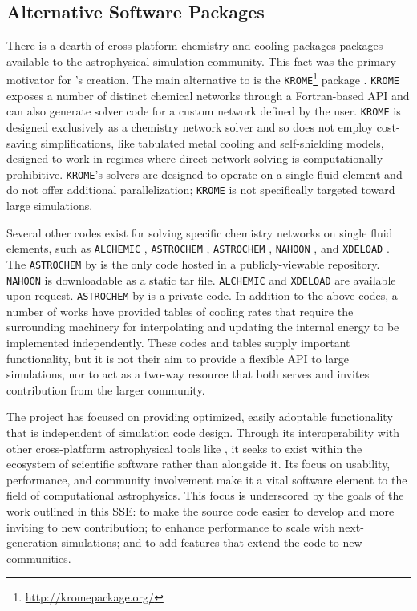 \subsection{Alternative Software Packages}

There is a dearth of cross-platform chemistry and cooling packages 
packages available to the astrophysical simulation community.  This
fact was the primary motivator for \grackle{}'s creation.  The main
alternative to \grackle{} is the 
\texttt{KROME}\footnote{\url{http://kromepackage.org/}} package
\citep{2014MNRAS.439.2386G}.  \texttt{KROME} exposes a number of
distinct chemical networks through a Fortran-based API and can also
generate solver code for a custom network defined by the user.
\texttt{KROME} is designed exclusively as a chemistry network solver
and so does not employ cost-saving simplifications, like tabulated
metal cooling and self-shielding models, designed to work in regimes
where direct network solving is computationally prohibitive.
\texttt{KROME}'s solvers are designed to operate on a single fluid
element and do not offer additional parallelization; \texttt{KROME} is
not specifically targeted toward large simulations.

Several other codes exist for solving specific chemistry
networks on single fluid elements, such as 
\texttt{ALCHEMIC} \citep{2010A&A...522A..42S}, \texttt{ASTROCHEM}
\citep{2013MNRAS.431..455K}, \texttt{ASTROCHEM} \citep[][unrelated to
the first \texttt{ASTROCHEM}]{2013A&A...559A..53M}, \texttt{NAHOON}
\citep{2012ApJS..199...21W}, and \texttt{XDELOAD}
\citep{2005Ap&SS.299....1N}.  The \texttt{ASTROCHEM} by
\citet{2013A&A...559A..53M} is the only code hosted in a
publicly-viewable repository.  \texttt{NAHOON} is downloadable as a
static tar file.  \texttt{ALCHEMIC} and \texttt{XDELOAD} are available
upon request.  \texttt{ASTROCHEM} by \citet{2013MNRAS.431..455K} is a
private code.
In addition to the above codes, a number of works have provided tables
of cooling rates \citep{1993ApJS...88..253S, 2009MNRAS.393...99W,
2013MNRAS.434.1043O} that require the surrounding machinery for
interpolating and updating the internal energy to be implemented
independently.
These codes and tables supply important functionality, but it is
not their aim to provide a flexible API to large simulations, nor to
act as a two-way resource that both serves and invites contribution
from the larger community.

The \grackle{} project has focused on providing optimized, easily
adoptable functionality that is independent of simulation code
design.  Through its interoperability with other cross-platform
astrophysical tools like \yt{}, it seeks to exist within the
ecosystem of scientific software rather than alongside it.
Its focus on usability, performance, and community
involvement make it a vital software element to the field of
computational astrophysics.  This focus is underscored by the goals
of the work outlined in this SSE:
to make the source code easier to develop and more inviting to new
contribution; to enhance performance to scale with next-generation
simulations; and to add features that extend the code to new
communities.

